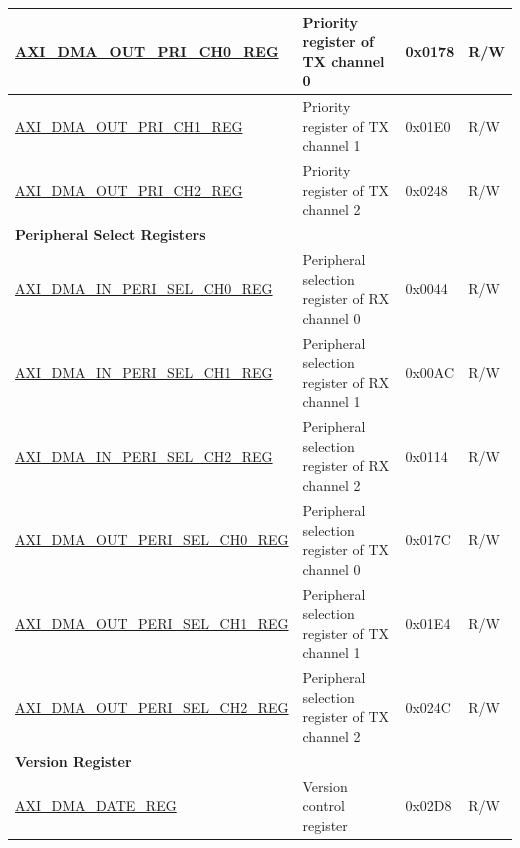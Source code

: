 \begin{longtable}{ | l | p{10cm} | p{1.3cm} | l | }
\hyperref[regdesc:AXIDMAOUTPRICHNREG]{AXI\_DMA\_OUT\_PRI\_CH0\_REG} & Priority register of TX channel 0 & 0x0178 & R/W \\ \hline
\hyperref[regdesc:AXIDMAOUTPRICHNREG]{AXI\_DMA\_OUT\_PRI\_CH1\_REG} & Priority register of TX channel 1 & 0x01E0 & R/W \\ \hline
\hyperref[regdesc:AXIDMAOUTPRICHNREG]{AXI\_DMA\_OUT\_PRI\_CH2\_REG} & Priority register of TX channel 2 & 0x0248 & R/W \\ \hline
\multicolumn{4}{|l|}{\textbf{Peripheral Select Registers}} \\ \hline
\hyperref[regdesc:AXIDMAINPERISELCHNREG]{AXI\_DMA\_IN\_PERI\_SEL\_CH0\_REG} & Peripheral selection register of RX channel 0 & 0x0044 & R/W \\ \hline
\hyperref[regdesc:AXIDMAINPERISELCHNREG]{AXI\_DMA\_IN\_PERI\_SEL\_CH1\_REG} & Peripheral selection register of RX channel 1 & 0x00AC & R/W \\ \hline
\hyperref[regdesc:AXIDMAINPERISELCHNREG]{AXI\_DMA\_IN\_PERI\_SEL\_CH2\_REG} & Peripheral selection register of RX channel 2 & 0x0114 & R/W \\ \hline
\hyperref[regdesc:AXIDMAOUTPERISELCHNREG]{AXI\_DMA\_OUT\_PERI\_SEL\_CH0\_REG} & Peripheral selection register of TX channel 0 & 0x017C & R/W \\ \hline
\hyperref[regdesc:AXIDMAOUTPERISELCHNREG]{AXI\_DMA\_OUT\_PERI\_SEL\_CH1\_REG} & Peripheral selection register of TX channel 1 & 0x01E4 & R/W \\ \hline
\hyperref[regdesc:AXIDMAOUTPERISELCHNREG]{AXI\_DMA\_OUT\_PERI\_SEL\_CH2\_REG} & Peripheral selection register of TX channel 2 & 0x024C & R/W \\ \hline
\multicolumn{4}{|l|}{\textbf{Version Register}} \\ \hline
\hyperref[regdesc:AXIDMADATEREG]{AXI\_DMA\_DATE\_REG} & Version control register & 0x02D8 & R/W \\ \hline
\end{longtable}
